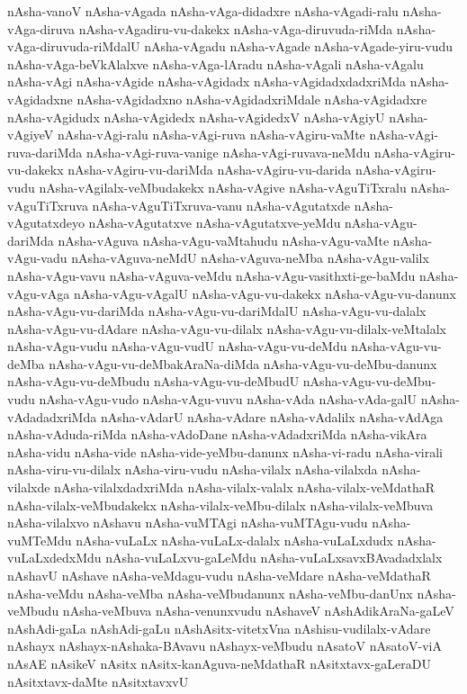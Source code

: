 {nAsha-vanoV
nAsha-vAgada
nAsha-vAga-didadxre
nAsha-vAgadi-ralu
nAsha-vAga-diruva
nAsha-vAgadiru-vu-dakekx
nAsha-vAga-diruvuda-riMda
nAsha-vAga-diruvuda-riMdalU
nAsha-vAgadu
nAsha-vAgade
nAsha-vAgade-yiru-vudu
nAsha-vAga-beVkAlalxve
nAsha-vAga-lAradu
nAsha-vAgali
nAsha-vAgalu
nAsha-vAgi
nAsha-vAgide
nAsha-vAgidadx
nAsha-vAgidadxdadxriMda
nAsha-vAgidadxne
nAsha-vAgidadxno
nAsha-vAgidadxriMdale
nAsha-vAgidadxre
nAsha-vAgidudx
nAsha-vAgidedx
nAsha-vAgidedxV
nAsha-vAgiyU
nAsha-vAgiyeV
nAsha-vAgi-ralu
nAsha-vAgi-ruva
nAsha-vAgiru-vaMte
nAsha-vAgi-ruva-dariMda
nAsha-vAgi-ruva-vanige
nAsha-vAgi-ruvava-neMdu
nAsha-vAgiru-vu-dakekx
nAsha-vAgiru-vu-dariMda
nAsha-vAgiru-vu-darida
nAsha-vAgiru-vudu
nAsha-vAgilalx-veMbudakekx
nAsha-vAgive
nAsha-vAguTiTxralu
nAsha-vAguTiTxruva
nAsha-vAguTiTxruva-vanu
nAsha-vAgutatxde
nAsha-vAgutatxdeyo
nAsha-vAgutatxve
nAsha-vAgutatxve-yeMdu
nAsha-vAgu-dariMda
nAsha-vAguva
nAsha-vAgu-vaMtahudu
nAsha-vAgu-vaMte
nAsha-vAgu-vadu
nAsha-vAguva-neMdU
nAsha-vAguva-neMba
nAsha-vAgu-valilx
nAsha-vAgu-vavu
nAsha-vAguva-veMdu
nAsha-vAgu-vasithxti-ge-baMdu
nAsha-vAgu-vAga
nAsha-vAgu-vAgalU
nAsha-vAgu-vu-dakekx
nAsha-vAgu-vu-danunx
nAsha-vAgu-vu-dariMda
nAsha-vAgu-vu-dariMdalU
nAsha-vAgu-vu-dalalx
nAsha-vAgu-vu-dAdare
nAsha-vAgu-vu-dilalx
nAsha-vAgu-vu-dilalx-veMtalalx
nAsha-vAgu-vudu
nAsha-vAgu-vudU
nAsha-vAgu-vu-deMdu
nAsha-vAgu-vu-deMba
nAsha-vAgu-vu-deMbakAraNa-diMda
nAsha-vAgu-vu-deMbu-danunx
nAsha-vAgu-vu-deMbudu
nAsha-vAgu-vu-deMbudU
nAsha-vAgu-vu-deMbu-vudu
nAsha-vAgu-vudo
nAsha-vAgu-vuvu
nAsha-vAda
nAsha-vAda-galU
nAsha-vAdadadxriMda
nAsha-vAdarU
nAsha-vAdare
nAsha-vAdalilx
nAsha-vAdAga
nAsha-vAduda-riMda
nAsha-vAdoDane
nAsha-vAdadxriMda
nAsha-vikAra
nAsha-vidu
nAsha-vide
nAsha-vide-yeMbu-danunx
nAsha-vi-radu
nAsha-virali
nAsha-viru-vu-dilalx
nAsha-viru-vudu
nAsha-vilalx
nAsha-vilalxda
nAsha-vilalxde
nAsha-vilalxdadxriMda
nAsha-vilalx-valalx
nAsha-vilalx-veMdathaR
nAsha-vilalx-veMbudakekx
nAsha-vilalx-veMbu-dilalx
nAsha-vilalx-veMbuva
nAsha-vilalxvo
nAshavu
nAsha-vuMTAgi
nAsha-vuMTAgu-vudu
nAsha-vuMTeMdu
nAsha-vuLaLx
nAsha-vuLaLx-dalalx
nAsha-vuLaLxdudx
nAsha-vuLaLxdedxMdu
nAsha-vuLaLxvu-gaLeMdu
nAsha-vuLaLxsavxBAvadadxlalx
nAshavU
nAshave
nAsha-veMdagu-vudu
nAsha-veMdare
nAsha-veMdathaR
nAsha-veMdu
nAsha-veMba
nAsha-veMbudanunx
nAsha-veMbu-danUnx
nAsha-veMbudu
nAsha-veMbuva
nAsha-venunxvudu
nAshaveV
nAshAdikAraNa-gaLeV
nAshAdi-gaLa
nAshAdi-gaLu
nAshAsitx-vitetxVna
nAshisu-vudilalx-vAdare
nAshayx
nAshayx-nAshaka-BAvavu
nAshayx-veMbudu
nAsatoV
nAsatoV-viA
nAsAE
nAsikeV
nAsitx
nAsitx-kanAguva-neMdathaR
nAsitxtavx-gaLeraDU
nAsitxtavx-daMte
nAsitxtavxvU
}
